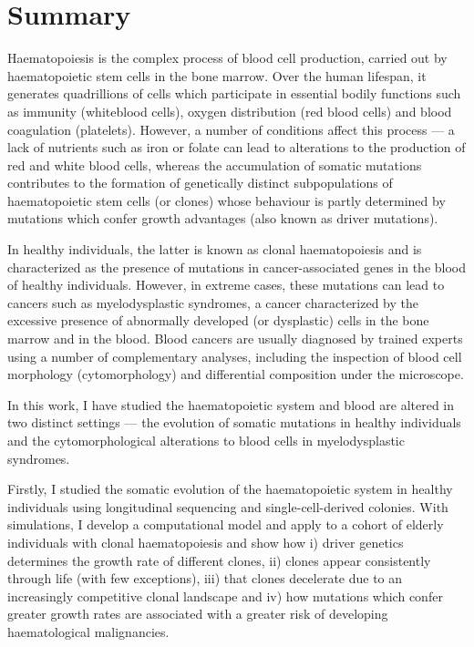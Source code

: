 \chapter{Summary}

Haematopoiesis is the complex process of blood cell production, carried out by haematopoietic stem cells in the bone marrow. Over the human lifespan, it generates quadrillions of cells which participate in essential bodily functions such as immunity (whiteblood cells), oxygen distribution (red blood cells) and blood coagulation (platelets). However, a number of conditions affect this process --- a lack of nutrients such as iron or folate can lead to alterations to the production of red and white blood cells, whereas the accumulation of somatic mutations contributes to the formation of genetically distinct subpopulations of haematopoietic stem cells (or clones) whose behaviour is partly determined by mutations which confer growth advantages (also known as driver mutations). 

In healthy individuals, the latter is known as clonal haematopoiesis and is characterized as the presence of mutations in cancer-associated genes in the blood of healthy individuals. However, in extreme cases, these mutations can lead to cancers such as myelodysplastic syndromes, a cancer characterized by the excessive presence of abnormally developed (or dysplastic) cells in the bone marrow and in the blood. Blood cancers are usually diagnosed by trained experts using a number of complementary analyses, including the inspection of blood cell morphology (cytomorphology) and differential composition under the microscope.

In this work, I have studied the haematopoietic system and blood are altered in two distinct settings --- the evolution of somatic mutations in healthy individuals and the cytomorphological alterations to blood cells in myelodysplastic syndromes.

Firstly, I studied the somatic evolution of the haematopoietic system in healthy individuals using longitudinal sequencing and single-cell-derived colonies. With simulations, I develop a computational model and apply to a cohort of elderly individuals with clonal haematopoiesis and show how i) driver genetics determines the growth rate of different clones, ii) clones appear consistently through life (with few exceptions), iii) that clones decelerate due to an increasingly competitive clonal landscape and iv) how mutations which confer greater growth rates are associated with a greater risk of developing haematological malignancies.

